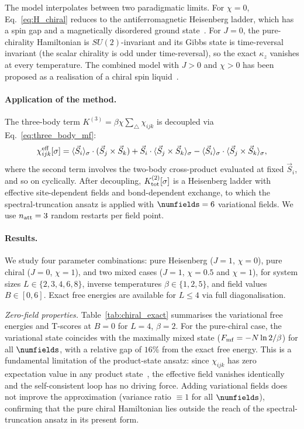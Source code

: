 The model interpolates between two paradigmatic limits.
For $\chi=0$, Eq.~\eqref{eq:H_chiral} reduces to the antiferromagnetic
Heisenberg ladder, which has a spin gap and a magnetically disordered ground
state~\cite{Dagotto1996}.
For $J=0$, the pure-chirality Hamiltonian is $SU(2)$-invariant and its Gibbs
state is time-reversal invariant (the scalar chirality is odd under
time-reversal), so the exact $\kappa_z$ vanishes at every temperature.
The combined model with $J>0$ and $\chi>0$ has been proposed as a realisation
of a chiral spin liquid~\cite{Wen1989}.

\paragraph{Application of the method.}
The three-body term $K^{(3)} = \beta\chi\sum_\triangle \chi_{ijk}$ is decoupled
via Eq.~\eqref{eq:three_body_mf}:
\begin{equation}
  \chi_{ijk}^{\rm eff}[\sigma]
  = \langle\vec{S}_i\rangle_\sigma\cdot(\vec{S}_j\times\vec{S}_k)
  + \vec{S}_i\cdot\langle\vec{S}_j\times\vec{S}_k\rangle_\sigma
  - \langle\vec{S}_i\rangle_\sigma\cdot\langle\vec{S}_j\times\vec{S}_k\rangle_\sigma,
\end{equation}
where the second term involves the two-body cross-product evaluated at fixed
$\vec{S}_i$, and so on cyclically.
After decoupling, $K^{(2)}_{\rm tot}[\sigma]$ is a Heisenberg ladder with
effective site-dependent fields and bond-dependent exchange, to which the
spectral-truncation ansatz is applied with $\numfields=6$ variational fields.
We use $n_{\rm att}=3$ random restarts per field point.

\paragraph{Results.}
We study four parameter combinations:
pure Heisenberg ($J=1$, $\chi=0$),
pure chiral ($J=0$, $\chi=1$),
and two mixed cases ($J=1$, $\chi=0.5$ and $\chi=1$),
for system sizes $L\in\{2,3,4,6,8\}$, inverse temperatures
$\beta\in\{1,2,5\}$, and field values $B\in[0,6]$.
Exact free energies are available for $L\le 4$ via full diagonalisation.

\textit{Zero-field properties.}
Table~\ref{tab:chiral_exact} summarises the variational free energies and
T-scores at $B=0$ for $L=4$, $\beta=2$.
For the pure-chiral case, the variational state coincides with the maximally
mixed state ($F_{\rm mf} = -N\ln 2 / \beta$) for all $\numfields$, with a
relative gap of $16\%$ from the exact free energy.
This is a fundamental limitation of the product-state ansatz: since
$\chi_{ijk}$ has zero expectation value in any product state~\cite{TODO}, the
effective field vanishes identically and the self-consistent loop has no
driving force.
Adding variational fields does not improve the approximation
(variance ratio $\equiv 1$ for all $\numfields$), confirming that the pure
chiral Hamiltonian lies outside the reach of the spectral-truncation ansatz
in its present form.

